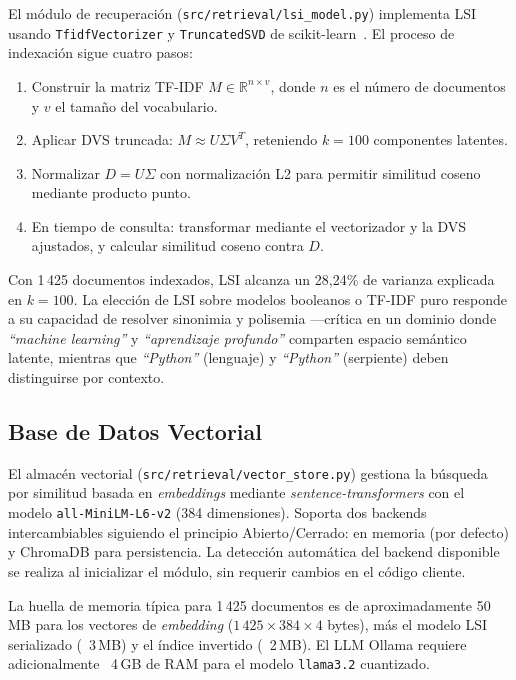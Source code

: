 \documentclass[runningheads,a4paper]{llncs}
\begin{document}
El módulo de recuperación (\texttt{src/retrieval/lsi\_model.py}) implementa LSI usando \texttt{TfidfVectorizer} y \texttt{TruncatedSVD} de scikit-learn~\cite{sklearn}. El proceso de indexación sigue cuatro pasos:

\begin{enumerate}
\item Construir la matriz TF-IDF $M \in \mathbb{R}^{n \times v}$, donde $n$ es el número de documentos y $v$ el tamaño del vocabulario.
\item Aplicar DVS truncada: $M \approx U \Sigma V^T$, reteniendo $k=100$ componentes latentes.
\item Normalizar $D = U\Sigma$ con normalización L2 para permitir similitud coseno mediante producto punto.
\item En tiempo de consulta: transformar mediante el vectorizador y la DVS ajustados, y calcular similitud coseno contra $D$.
\end{enumerate}

Con 1\,425 documentos indexados, LSI alcanza un 28,24\% de varianza explicada en $k=100$. La elección de LSI sobre modelos booleanos o TF-IDF puro responde a su capacidad de resolver sinonimia y polisemia —crítica en un dominio donde \emph{``machine learning''} y \emph{``aprendizaje profundo''} comparten espacio semántico latente, mientras que \emph{``Python''} (lenguaje) y \emph{``Python''} (serpiente) deben distinguirse por contexto.

\subsection{Base de Datos Vectorial}

El almacén vectorial (\texttt{src/retrieval/vector\_store.py}) gestiona la búsqueda por similitud basada en \emph{embeddings} mediante \emph{sentence-transformers} con el modelo \texttt{all-MiniLM-L6-v2} (384 dimensiones). Soporta dos backends intercambiables siguiendo el principio Abierto/Cerrado: en memoria (por defecto) y ChromaDB para persistencia. La detección automática del backend disponible se realiza al inicializar el módulo, sin requerir cambios en el código cliente.

La huella de memoria típica para 1\,425 documentos es de aproximadamente 50\,MB para los vectores de \emph{embedding} ($1\,425 \times 384 \times 4$ bytes), más el modelo LSI serializado (~3\,MB) y el índice invertido (~2\,MB). El LLM Ollama requiere adicionalmente ~4\,GB de RAM para el modelo \texttt{llama3.2} cuantizado.
\end{document}
